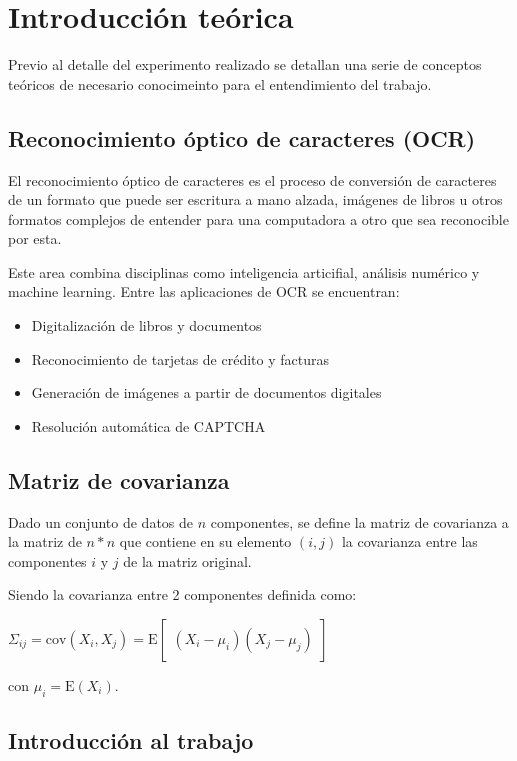 \section{Introducci\'on te\'orica}

Previo al detalle del experimento realizado se detallan una serie de conceptos te\'oricos de necesario
conocimeinto para el entendimiento del trabajo.

\subsection{Reconocimiento \'optico de caracteres (OCR)}

El reconocimiento \'optico de caracteres es el proceso de conversi\'on de caracteres de un formato que puede
ser escritura a mano alzada, im\'agenes de libros u otros formatos complejos de entender para una computadora
a otro que sea reconocible por esta.

Este area combina disciplinas como inteligencia articifial, an\'alisis num\'erico y machine learning. Entre
las aplicaciones de OCR se encuentran:

\begin{itemize}
  \item Digitalizaci\'on de libros y documentos
  \item Reconocimiento de tarjetas de cr\'edito y facturas
  \item Generaci\'on de im\'agenes a partir de documentos digitales
  \item Resoluci\'on autom\'atica de CAPTCHA
\end{itemize}

\subsection{Matriz de covarianza}

Dado un conjunto de datos de $n$ componentes, se define la matriz de covarianza a la matriz de $n*n$ que
contiene en su elemento $(i, j)$ la covarianza entre las componentes $i$ y $j$ de la matriz original.

Siendo la covarianza entre 2 componentes definida como: 

$\Sigma_{ij} = \mathrm{cov}(X_i, X_j) = \mathrm{E}\begin{bmatrix} (X_i - \mu_i)(X_j - \mu_j) \end{bmatrix}$

con $\mu_i = \mathrm{E}(X_i)$.


\subsection{Introducci\'on al trabajo}


